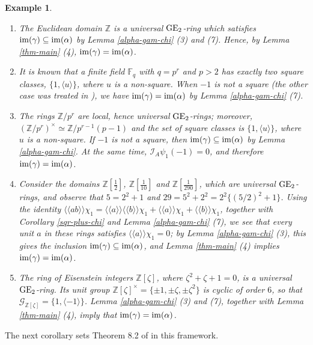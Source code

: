 \documentclass[11pt]{amsart}
\theoremstyle{definition}
\theoremstyle{plain}
\newtheorem{exm}[ntn]{Example}
\numberwithin{equation}{section}
\newcommand{\z}{\mathbb{Z}}
\newcommand{\F}{\mathbb{F}}
\newcommand{\GG}{\mathcal{G}}
\newcommand{\II}{\mathcal{I}}
\newcommand{\lan}{\langle}
\newcommand{\ran}{\rangle}
\newcommand{\Lan}{\langle \! \langle}
\newcommand{\Ran}{\rangle \! \rangle}
\newcommand{\GE}{{\rm GE}}
\newcommand{\im}{{\rm im}}
\begin{document}
\begin{exm}\label{ex-im-eq}
\begin{enumerate}
    \item The Euclidean domain $\z$ is a universal $\GE_2$-ring which satisfies $\im(\gamma)\subseteq\im(\alpha)$ by Lemma \ref{alpha-gam-chi} (3) and (7). Hence, by Lemma \ref{thm-main} (4), $\im(\gamma)=\im(\alpha)$.
    \item It is known that a finite field $\F_q$ with $q=p^r$ and $p>2$ has exactly two square classes, $\{1,\langle u\rangle\}$, where $u$ is a non-square. When $-1$ is not a square (the other case was treated in \cite{B-E--2023}), we have $\im(\gamma)=\im(\alpha)$ by Lemma \ref{alpha-gam-chi} (7).
    \item The rings $\z/p^r$ are local, hence universal $\GE_2$-rings; moreover, $(\z/p^r)^\times\simeq\z/p^{r-1}(p-1)$ and the set of square classes is $\{1,\langle u\rangle\}$, where $u$ is a non-square. If $-1$ is not a square, then $\im(\gamma)\subseteq\im(\alpha)$ by Lemma \ref{alpha-gam-chi}. At the same time, $\II_A\psi_1(-1)=0$, and therefore $\im(\gamma)=\im(\alpha)$.
    \item Consider the domains $\z\left[\frac{1}{2}\right]$, $\z\left[\frac{1}{10}\right]$ and $\z\left[\frac{1}{290}\right]$, which are universal $\GE_2$-rings, and observe that $5=2^2+1$ and $29=5^2+2^2=2^2\{(5/2)^2+1\}$. Using the identity $\Lan ab\Ran\chi_1=\Lan a\Ran\Lan b\Ran\chi_1+\Lan a\Ran\chi_1+\Lan b\Ran\chi_1$, together with Corollary \ref{sqr-plus-chi} and Lemma \ref{alpha-gam-chi} (7), we see that every unit $a$ in these rings satisfies $\Lan a\Ran\chi_1=0$; by Lemma \ref{alpha-gam-chi} (3), this gives the inclusion $\im(\gamma)\subseteq\im(\alpha)$, and Lemma \ref{thm-main} (4) implies $\im(\gamma)=\im(\alpha)$.
    \item The ring of Eisenstein integers $\z[\zeta]$, where $\zeta^2+\zeta+1=0$, is a universal $\GE_2$-ring. Its unit group $\z[\zeta]^\times=\{\pm 1,\pm\zeta,\pm\zeta^2\}$ is cyclic of order $6$, so that $\GG_{\z[\zeta]}=\{1,\lan-1\ran\}$. Lemma \ref{alpha-gam-chi} (3) and (7), together with Lemma \ref{thm-main} (4), imply that $\im(\gamma)=\im(\alpha)$.
\end{enumerate}
\end{exm}
The next corollary sets Theorem 8.2 of \cite{B-E--2023} in this framework.
\end{document}

